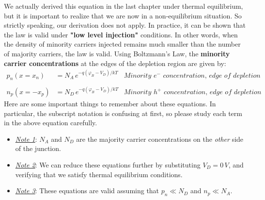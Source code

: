 We actually derived this equation in the last chapter under thermal equilibrium, but it is important to realize that we are now in a non-equilibrium situation.  So strictly speaking, our derivation does not apply.  In practice, it can be shown that the law is valid under \textbf{"low level injection"} conditions.  In other words, when the density of minority carriers injected remains much smaller than the number of majority carriers, the law is valid.  Using Boltzmann's Law, the \textbf{minority carrier concentrations} at the edges of the depletion region are given by:
    \begin{align} 
        p_n(x = x_n) &= N_A\,e^{-q({\varphi_B} - V_D)/kT} &\textit{Minority $e^-$ concentration, edge of depletion}\\ \\
        n_p(x = -x_p) &= N_D\,e^{-q({\varphi_B} - V_D)/kT} &\textit{Minority $h^+$ concentration, edge of depletion}
    \end{align}
Here are some important things to remember about these equations.  In particular, the subscript notation is confusing at first, so please study each term in the above equation carefully.
\vspace{0.35cm}
    \begin{itemize}
        \item{\textit{\underline{Note 1}}: $N_A$ and $N_D$ are the majority carrier concentrations on the \textit{other} side of the junction.}\vspace{0.15cm}
        \item{\textit{\underline{Note 2}}: We can reduce these equations further by substituting $V_D = 0\,V$, and verifying that we satisfy thermal equilibrium conditions.}\vspace{0.15cm}
        \item{\textit{\underline{Note 3}}: These equations are valid assuming that $p_n \ll N_D$ and $n_p \ll N_A$.}
    \end{itemize}
\newpage
